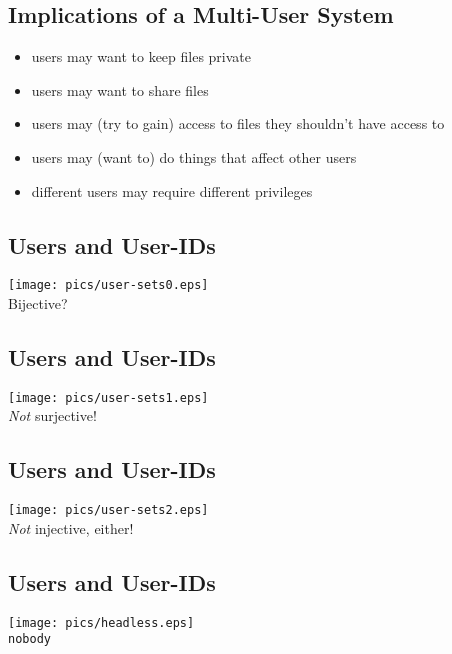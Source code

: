 \documentclass[xga]{xdvislides}
\begin{document}
\subsection{Implications of a Multi-User System}
\begin{itemize}
	\item users may want to keep files private
	\item users may want to share files
	\item users may (try to gain) access to files they shouldn't have access to
	\item users may (want to) do things that affect other users
	\item different users may require different privileges
\end{itemize}

\subsection{Users and User-IDs}
\begin{center}
	\texttt{[image: pics/user-sets0.eps]} \\
	Bijective?
\end{center}

\subsection{Users and User-IDs}
\begin{center}
	\texttt{[image: pics/user-sets1.eps]} \\
	{\em Not} surjective!
\end{center}

\subsection{Users and User-IDs}
\begin{center}
	\texttt{[image: pics/user-sets2.eps]} \\
	{\em Not} injective, either!
\end{center}

\subsection{Users and User-IDs}

\begin{center}
	\texttt{[image: pics/headless.eps]} \\
	{\tt nobody}
\end{center}
\end{document}
